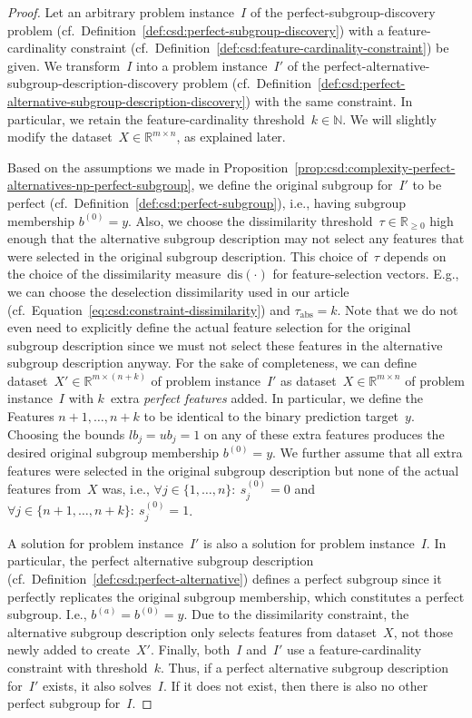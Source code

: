 \documentclass{article}
\theoremstyle{definition}
\begin{document}
\begin{proof}
Let an arbitrary problem instance~$I$ of the perfect-subgroup-discovery problem (cf.~Definition~\ref{def:csd:perfect-subgroup-discovery}) with a feature-cardinality constraint (cf.~Definition~\ref{def:csd:feature-cardinality-constraint}) be given.	
We transform~$I$ into a problem instance~$I'$ of the perfect-alternative-subgroup-description-discovery problem (cf.~Definition~\ref{def:csd:perfect-alternative-subgroup-description-discovery}) with the same constraint.
In particular, we retain the feature-cardinality threshold~$k \in \mathbb{N}$.
We will slightly modify the dataset~$X \in \mathbb{R}^{m \times n}$, as explained later.

Based on the assumptions we made in Proposition~\ref{prop:csd:complexity-perfect-alternatives-np-perfect-subgroup}, we define the original subgroup for~$I'$ to be perfect (cf.~Definition~\ref{def:csd:perfect-subgroup}), i.e., having subgroup membership $b^{(0)} = y$.
Also, we choose the dissimilarity threshold~$\tau \in \mathbb{R}_{\geq 0}$ high enough that the alternative subgroup description may not select any features that were selected in the original subgroup description.
This choice of~$\tau$ depends on the choice of the dissimilarity measure~$\text{dis}(\cdot)$ for feature-selection vectors.
E.g., we can choose the deselection dissimilarity used in our article (cf.~Equation~\ref{eq:csd:constraint-dissimilarity}) and $\tau_{\text{abs}} = k$.
Note that we do not even need to explicitly define the actual feature selection for the original subgroup description since we must not select these features in the alternative subgroup description anyway.
For the sake of completeness, we can define dataset~$X' \in \mathbb{R}^{m \times (n+k)}$ of problem instance~$I'$ as dataset~$X \in \mathbb{R}^{m \times n}$ of problem instance~$I$ with $k$~extra \emph{perfect features} added.
In particular, we define the Features $n+1, \dots, n+k$ to be identical to the binary prediction target~$y$.
Choosing the bounds $\mathit{lb}_j = \mathit{ub}_j = 1$ on any of these extra features produces the desired original subgroup membership $b^{(0)} = y$.
We further assume that all extra features were selected in the original subgroup description but none of the actual features from~$X$ was, i.e., $\forall j \in \{1, \dots, n\}:~ s^{(0)}_j = 0$ and $\forall j \in \{n+1, \dots, n+k\}:~ s^{(0)}_j = 1$.

A solution for problem instance~$I'$ is also a solution for problem instance~$I$.
In particular, the perfect alternative subgroup description (cf.~Definition~\ref{def:csd:perfect-alternative}) defines a perfect subgroup since it perfectly replicates the original subgroup membership, which constitutes a perfect subgroup.
I.e., $b^{(a)} = b^{(0)} = y$.
Due to the dissimilarity constraint, the alternative subgroup description only selects features from dataset~$X$, not those newly added to create~$X'$.
Finally, both~$I$ and~$I'$ use a feature-cardinality constraint with threshold~$k$.
Thus, if a perfect alternative subgroup description for~$I'$ exists, it also solves~$I$.
If it does not exist, then there is also no other perfect subgroup for~$I$.


\end{proof}
\end{document}

